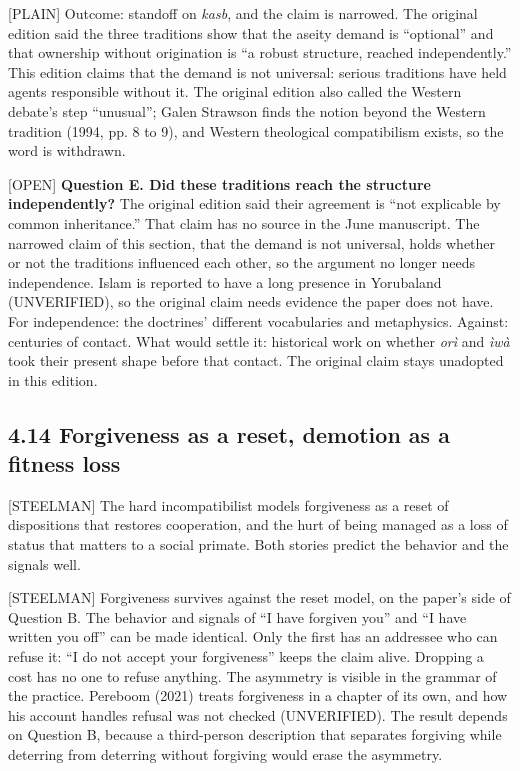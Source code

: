 \documentclass[11pt]{article}
\newcommand{\register}[1]{{\ttfamily\small #1}}
\begin{document}
\register{[PLAIN]} Outcome: standoff on \emph{kasb}, and the claim is narrowed. The original edition said the three traditions show that the aseity demand is ``optional'' and that ownership without origination is ``a robust structure, reached independently.'' This edition claims that the demand is not universal: serious traditions have held agents responsible without it. The original edition also called the Western debate's step ``unusual''; Galen Strawson finds the notion beyond the Western tradition (1994, pp. 8 to 9), and Western theological compatibilism exists, so the word is withdrawn.

\register{[OPEN]} \textbf{Question E. Did these traditions reach the structure independently?} The original edition said their agreement is ``not explicable by common inheritance.'' That claim has no source in the June manuscript. The narrowed claim of this section, that the demand is not universal, holds whether or not the traditions influenced each other, so the argument no longer needs independence. Islam is reported to have a long presence in Yorubaland (UNVERIFIED), so the original claim needs evidence the paper does not have. For independence: the doctrines' different vocabularies and metaphysics. Against: centuries of contact. What would settle it: historical work on whether \emph{orì} and \emph{ìwà} took their present shape before that contact. The original claim stays unadopted in this edition.

\subsection*{4.14 Forgiveness as a reset, demotion as a fitness loss}

\register{[STEELMAN]} The hard incompatibilist models forgiveness as a reset of dispositions that restores cooperation, and the hurt of being managed as a loss of status that matters to a social primate. Both stories predict the behavior and the signals well.

\register{[STEELMAN]} Forgiveness survives against the reset model, on the paper's side of Question B. The behavior and signals of ``I have forgiven you'' and ``I have written you off'' can be made identical. Only the first has an addressee who can refuse it: ``I do not accept your forgiveness'' keeps the claim alive. Dropping a cost has no one to refuse anything. The asymmetry is visible in the grammar of the practice. Pereboom (2021) treats forgiveness in a chapter of its own, and how his account handles refusal was not checked (UNVERIFIED). The result depends on Question B, because a third-person description that separates forgiving while deterring from deterring without forgiving would erase the asymmetry.
\end{document}
